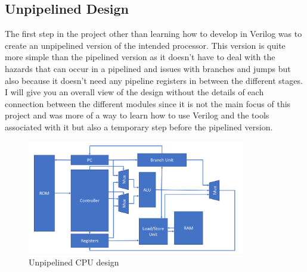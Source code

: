 \subsection{Unpipelined Design}
The first step in the project other than learning how to develop in Verilog was to create an unpipelined version of the intended processor.
This version is quite more simple than the pipelined version as it doesn't have to deal with the hazards that can occur in a pipelined and 
issues with branches and jumps but also because it doesn't need any pipeline registers in between the different stages. I will give you an 
overall view of the design without the details of each connection between the different modules since it is not the main focus of this project 
and was more of a way to learn how to use Verilog and the tools associated with it but also a temporary step before the pipelined version.

\begin{figure}[H]
    \centering
    \includegraphics[width=0.85\textwidth]{design/unpipelined/images/unpipelined_cpu.png}
    \caption{Unpipelined CPU design}
    \label{fig:unpipelined_cpu_design}
\end{figure}

